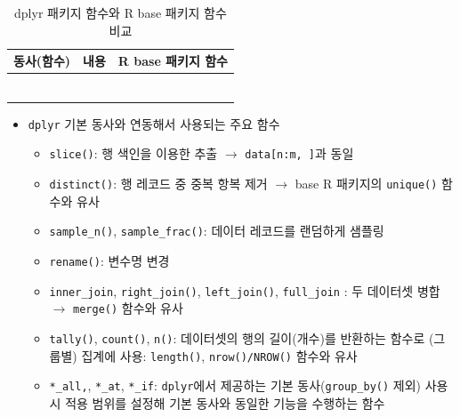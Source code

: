 \documentclass[
  11pt,
]{krantz}
\begin{document}
\footnotesize

\begin{table}[H]

\caption{\label{tab:unnamed-chunk-11}dplyr 패키지 함수와 R base 패키지 함수 비교}
\centering
\fontsize{10}{12}\selectfont
\begin{tabu} to 
\toprule
동사(함수) & 내용 & R base 패키지 함수\\
\midrule
{}   &  & \\
 &  & \\
   &  & \\
 &  & \\
   &  & \\
\addlinespace
{} &  & \ttfamily{}\\
\bottomrule
\end{tabu}
\end{table}

\normalsize

\begin{itemize}
\item
  \texttt{dplyr} 기본 동사와 연동해서 사용되는 주요 함수

  \begin{itemize}
  \item
    \texttt{slice()}: 행 색인을 이용한 추출 \(\rightarrow\) \texttt{data{[}n:m,\ {]}}과 동일
  \item
    \texttt{distinct()}: 행 레코드 중 중복 항복 제거 \(\rightarrow\) base R 패키지의 \texttt{unique()} 함수와 유사
  \item
    \texttt{sample\_n()}, \texttt{sample\_frac()}: 데이터 레코드를 랜덤하게 샘플링
  \item
    \texttt{rename()}: 변수명 변경
  \item
    \texttt{inner\_join}, \texttt{right\_join()}, \texttt{left\_join()}, \texttt{full\_join} : 두 데이터셋 병합 \(\rightarrow\) \texttt{merge()} 함수와 유사
  \item
    \texttt{tally()}, \texttt{count()}, \texttt{n()}: 데이터셋의 행의 길이(개수)를 반환하는 함수로 (그룹별) 집계에 사용: \texttt{length()}, \texttt{nrow()/NROW()} 함수와 유사
  \item
    \texttt{*\_all,}, \texttt{*\_at}, \texttt{*\_if}: \texttt{dplyr}에서 제공하는 기본 동사(\texttt{group\_by()} 제외) 사용 시 적용 범위를 설정해 기본 동사와 동일한 기능을 수행하는 함수
  \end{itemize}
\end{itemize}
\end{document}
